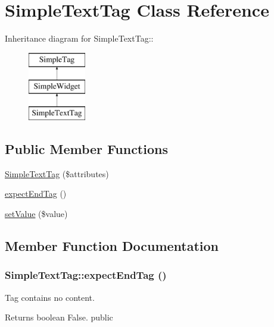 \hypertarget{class_simple_text_tag}{
\section{SimpleTextTag Class Reference}
\label{class_simple_text_tag}
}
Inheritance diagram for SimpleTextTag::\begin{figure}[H]
\begin{center}
\leavevmode
\includegraphics[height=3cm]{class_simple_text_tag}
\end{center}
\end{figure}
\subsection*{Public Member Functions}
\begin{DoxyCompactItemize}
\item 
\hyperlink{class_simple_text_tag_aae6625ae2b202a046e32ab1dfae717d6}{SimpleTextTag} (\$attributes)
\item 
\hyperlink{class_simple_text_tag_aa1e96d7cb8af41a9fd588f5bf3cf8b26}{expectEndTag} ()
\item 
\hyperlink{class_simple_text_tag_a255675d0e1f881000de30be56723db31}{setValue} (\$value)
\end{DoxyCompactItemize}


\subsection{Member Function Documentation}
\hypertarget{class_simple_text_tag_aa1e96d7cb8af41a9fd588f5bf3cf8b26}{
\subsubsection[{expectEndTag}]{\setlength{\rightskip}{0pt plus 5cm}SimpleTextTag::expectEndTag ()}}
\label{class_simple_text_tag_aa1e96d7cb8af41a9fd588f5bf3cf8b26}
Tag contains no content. \begin{DoxyReturn}{Returns}
boolean False.  public 
\end{DoxyReturn}


